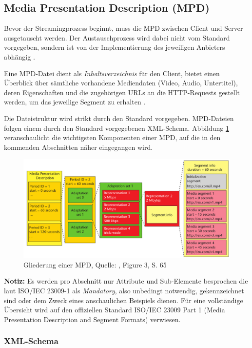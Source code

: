 \documentclass[paper = a4, fontsize = 12pt, parskip = half]{scrartcl} %
\begin{document}
\subsection{Media Presentation Description (MPD)}
Bevor der Streamingprozess beginnt, muss die MPD zwischen Client und Server ausgetauscht werden. Der Austauschprozess wird dabei nicht vom Standard vorgegeben, sondern ist von der Implementierung des jeweiligen Anbieters abhängig \cite{sodagar_mpeg-dash_2011}.

Eine MPD-Datei dient als \textit{Inhaltsverzeichnis} für den Client, bietet einen Überblick über sämtliche vorhandene Mediendaten (Video, Audio, Untertitel), deren Eigenschaften und die zugehörigen URLs an die HTTP-Requests gestellt werden, um das jeweilige Segment zu erhalten \cite{international_organization_for_standardization_isoiec_nodate}.

Die Dateistruktur wird strikt durch den Standard vorgegeben. MPD-Dateien folgen einem durch den Standard vorgegebenen XML-Schema. Abbildung \ref{mpd_components} veranschaulicht die wichtigsten Komponenten einer MPD, auf die in den kommenden Abschnitten näher eingegangen wird.

	\begin{figure}[ht]
		\centering
		\includegraphics[width=12cm]{images/mpd-structure.png}
		\caption{Gliederung einer MPD, Quelle: \cite{sodagar_mpeg-dash_2011}, Figure 3, S. 65}
		\label{mpd_components}
	\end{figure}

\textbf{Notiz:} Es werden pro Abschnitt nur Attribute und Sub-Elemente besprochen die laut ISO/IEC 23009-1 als \textit{Mandatory}, also unbedingt notwendig, gekennzeichnet sind oder dem Zweck eines anschaulichen Beispiels dienen. Für eine vollständige Übersicht wird auf den offiziellen Standard ISO/IEC 23009 Part 1 (Media Presentation Description and Segment Formats) verwiesen.

\subsubsection{XML-Schema}
\end{document}
